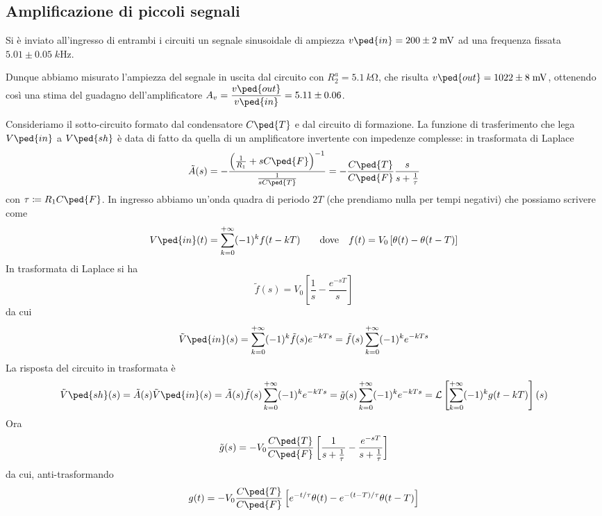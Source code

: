 \documentclass[10pt,a4paper]{article}
\begin{document}
\subsection{Amplificazione di piccoli segnali}
Si è inviato all'ingresso di entrambi i circuiti un segnale sinusoidale di
ampiezza $v\ped{in} = 200 \pm 2 \; \si{m\V}$ ad una frequenza fissata
$5.01 \pm 0.05 \; \si{k\Hz}$.

Dunque abbiamo misurato l'ampiezza del segnale in uscita dal circuito con
$R_2^a = \SI{5.1}{k\ohm}$, che risulta $v\ped{out} = 1022 \pm 8 \; \si{m\V}$,
ottenendo così una stima del guadagno dell'amplificatore
$A_v = \dfrac{v\ped{out}}{v\ped{in}} = 5.11 \pm 0.06 $.

Consideriamo il sotto-circuito formato dal condensatore $ C\ped{T} $ e dal 
circuito di formazione. La funzione di trasferimento che lega $ 
V\ped{in} $ a $ V\ped{sh} $ è data di fatto da quella di un amplificatore 
invertente con impedenze complesse: in trasformata di Laplace
\[
\tilde{A}(s) = - \frac{\left(\frac{1}{R_{1}} + s 
C\ped{F}\right)^{-1}}{\frac{1}{s C\ped{T}}} = - \frac{C\ped{T}}{C\ped{F}} 
\frac{s}{s + \frac{1}{\tau}}
\]
con $ \tau \coloneqq R_{1} C\ped{F} $. In ingresso abbiamo un'onda quadra di 
periodo $ 2T $ (che prendiamo nulla per tempi negativi) che possiamo scrivere 
come
\[
V\ped{in}(t) = \sum_{k=0}^{+\infty} (-1)^{k}f(t - kT)
\qquad \text{dove} \quad
f(t) = V_{0} \left[\theta(t) - \theta(t - T)\right]
\]
In trasformata di Laplace si ha
\[
\tilde{f}(s) = V_{0}\left[\frac{1}{s} - \frac{e^{-sT}}{s}\right]
\]
da cui
\[
\tilde{V}\ped{in}(s) = \sum_{k=0}^{+\infty} (-1)^{k} \tilde{f}(s) e^{-kTs} = 
\tilde{f}(s) \sum_{k=0}^{+\infty} (-1)^{k} e^{-kTs}
\]
La risposta del circuito in trasformata è
\[
  \tilde{V}\ped{sh}(s) = \tilde{A}(s) \tilde{V}\ped{in}(s) =  
\tilde{A}(s)\tilde{f}(s) \sum_{k=0}^{+\infty} (-1)^{k}e^{-kTs} = \tilde{g}(s) 
\sum_{k=0}^{+\infty} (-1)^{k}e^{-kTs} = \mathcal{L}\left[\sum_{k=0}^{+\infty} 
(-1)^{k}g(t - kT)\right](s)
\]
Ora
\[
  \tilde{g}(s) = - V_{0} \frac{C\ped{T}}{C\ped{F}} \left[\frac{1}{s + 
\frac{1}{\tau}} - \frac{e^{-sT}}{s + \frac{1}{\tau}}\right]
\]
da cui, anti-trasformando
\[
  g(t) = - V_{0} \frac{C\ped{T}}{C\ped{F}} \left[e^{-t/\tau}\theta(t) - 
e^{-(t-T)/\tau} \theta(t - T) \right]
\]
\end{document}

